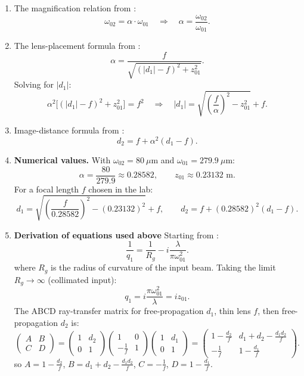 \documentclass[11pt, letterpaper]{article}
\begin{document}
\begin{enumerate}
    \item The magnification relation from \cite{edmund}:
\begin{equation}\label{M}
    \omega_{02}=\alpha\cdot\omega_{01}
    \quad\Rightarrow\quad
    \alpha=\frac{\omega_{02}}{\omega_{01}}.
\end{equation}

    \item The lens-placement formula from \cite{edmund}:
\begin{equation}\label{18}
    \alpha = \frac{f}{\sqrt{(|d_1| - f)^2 + z_{01}^2}}.
\end{equation}
Solving for $|d_1|$:
$$\alpha^2\bigl[(|d_1|-f)^2+z_{01}^2\bigr]=f^2
\quad\Rightarrow\quad
|d_1|=\sqrt{\left(\frac{f}{\alpha}\right)^2-z_{01}^2}+f.$$

    \item Image-distance formula from \cite{edmund}:
\begin{equation}\label{22}
    d_2 = f + \alpha^2(d_1 - f).
\end{equation}

    \item \textbf{Numerical values.} With $\omega_{02}=80~\mu$m and $\omega_{01}=279.9~\mu$m:
$$\alpha=\frac{80}{279.9}\approx 0.28582,\qquad z_{01}\approx 0.23132\text{ m}.$$
For a focal length $f$ chosen in the lab:
$$d_1 = \sqrt{\left(\frac{f}{0.28582}\right)^2-(0.23132)^2}+f,
\qquad
d_2 = f + (0.28582)^2(d_1-f).$$

    \item \textbf{Derivation of equations used above} Starting from \cite{Osche}:
\begin{equation}\label{complex}
    \frac{1}{q_1} = \frac{1}{R_{g}} - i\frac{\lambda}{\pi \omega_{01}^2}.
\end{equation}
where $R_g$ is the radius of curvature of the input beam. Taking the limit $R_g\to\infty$ (collimated input):
$$q_1 = i\frac{\pi \omega_{01}^2}{\lambda}=iz_{01}.$$
The ABCD ray-transfer matrix for free-propagation $d_1$, thin lens $f$, then free-propagation $d_2$ is:
$$\begin{pmatrix} A & B \\ C & D \end{pmatrix}
= \begin{pmatrix} 1 & d_2 \\ 0 & 1 \end{pmatrix}
  \begin{pmatrix} 1 & 0 \\ -\frac{1}{f} & 1 \end{pmatrix}
  \begin{pmatrix} 1 & d_1 \\ 0 & 1 \end{pmatrix}
=\begin{pmatrix} 1 - \frac{d_2}{f} & d_1 + d_2 - \frac{d_1 d_2}{f} \\ -\frac{1}{f} & 1 - \frac{d_1}{f} \end{pmatrix}.$$
so $A=1 - \frac{d_2}{f}$, $B=d_1 + d_2 - \frac{d_1 d_2}{f}$, $C=-\frac{1}{f}$, $D=1 - \frac{d_1}{f}$.


\end{enumerate}
\end{document}
